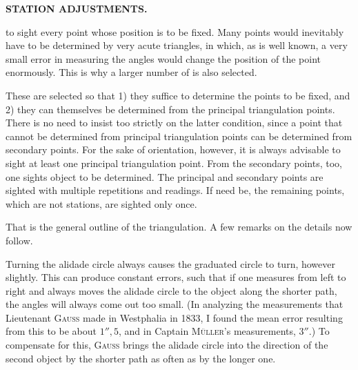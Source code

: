 \par\clearpage
\noindent\null\hfill{\small\textbf{STATION ADJUSTMENTS.}}\hfill{}\par\medskip

\noindent to sight every point whose position is to be fixed. Many points would inevitably have to be determined by very acute triangles, in which, as is well known, a very small error in measuring the angles would change the position of the point enormously. This is why a larger number of  is also selected.

These are selected so that 1) they suffice to determine  the points to be fixed, and 2)  they can themselves be determined  from the principal triangulation points. There is no need to insist too strictly on the latter condition, since a point that cannot be determined from principal triangulation points can be determined from secondary points. For the sake of orientation, however, it is always advisable to sight at least one principal triangulation point. From the secondary points, too, one sights  object to be determined. The principal and secondary points are sighted with multiple repetitions and readings. If need be, the remaining points, which are not stations, are sighted only once.

That is the general outline of the triangulation. A few remarks on the details now follow.\par
\noindent Turning the alidade circle always causes the graduated circle to turn, however slightly. This can produce constant errors, such that if one measures from left to right and always moves the alidade circle to the object along the shorter path, the angles will always come out too small. (In analyzing the measurements that Lieutenant \textsc{Gauss} made in Westphalia in 1833, I found the mean error resulting from this to be about \(1''{,}5\), and in Captain \textsc{Müller}'s measurements, \(3''\).) To compensate for this, \textsc{Gauss} brings the alidade circle into the direction of the second object by the shorter path as often as by the longer one.

\begin{center}
\end{center}

